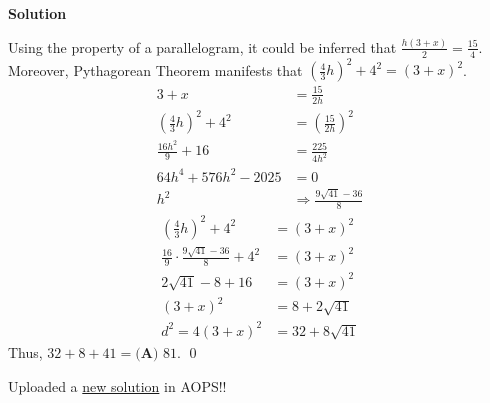 \documentclass{article}
\newenvironment{solution}{\begin{trivlist}\item[]{\bf Solution}}{\qed \end{trivlist}}
\begin{document}
\begin{solution}
\begin{center}
\end{center}
Using the property of a parallelogram, it could be inferred that $\frac{h(3+x)}{2}=\frac{15}{4}$. Moreover, Pythagorean Theorem manifests that $\left(\frac{4}{3}h\right)^2+4^2=(3+x)^2$.
\begin{align*}
    3+x&=\frac{15}{2h} \\
    \left(\frac{4}{3}h\right)^2+4^2&=\left(\frac{15}{2h}\right)^2 \\
    \frac{16h^2}{9}+16&=\frac{225}{4h^2} \\
    64h^4+576h^2-2025&=0 \\
    h^2&\Rightarrow\frac{9\sqrt{41}-36}{8}
\end{align*}
\begin{align*}
    \left(\frac{4}{3}h\right)^2+4^2&=(3+x)^2 \\
    \frac{16}{9}\cdot\frac{9\sqrt{41}-36}{8}+4^2&=(3+x)^2 \\
    2\sqrt{41}-8+16&=(3+x)^2 \\
    (3+x)^2&=8+2\sqrt{41} \\
    d^2=4(3+x)^2&=32+8\sqrt{41}
\end{align*}
Thus, $32+8+41=\boxed{\textbf{(A) }81}$.
\end{solution}
Uploaded a \href{https://artofproblemsolving.com/wiki/index.php/2021_AMC_12B_Problems/Problem_24#Solution_8}{new solution} in AOPS!! \\

\newpage
\end{document}
